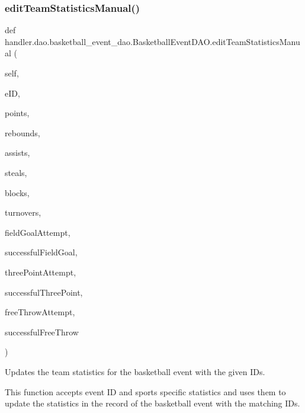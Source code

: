 \subsubsection{\texorpdfstring{edit\+Team\+Statistics\+Manual()}{editTeamStatisticsManual()}}
{\footnotesize\ttfamily def handler.\+dao.\+basketball\+\_\+event\+\_\+dao.\+Basketball\+Event\+D\+A\+O.\+edit\+Team\+Statistics\+Manual (\begin{DoxyParamCaption}\item[{}]{self,  }\item[{}]{e\+ID,  }\item[{}]{points,  }\item[{}]{rebounds,  }\item[{}]{assists,  }\item[{}]{steals,  }\item[{}]{blocks,  }\item[{}]{turnovers,  }\item[{}]{field\+Goal\+Attempt,  }\item[{}]{successful\+Field\+Goal,  }\item[{}]{three\+Point\+Attempt,  }\item[{}]{successful\+Three\+Point,  }\item[{}]{free\+Throw\+Attempt,  }\item[{}]{successful\+Free\+Throw }\end{DoxyParamCaption})}



Updates the team statistics for the basketball event with the given I\+Ds. 

This function accepts event ID and sports specific statistics and uses them to update the statistics in the record of the basketball event with the matching I\+Ds.


